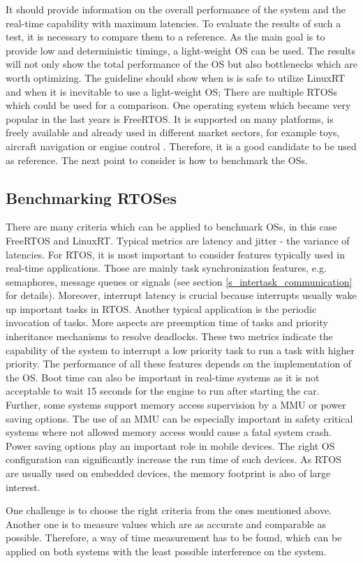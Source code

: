 It should provide information on the overall performance of the system and the real-time capability with maximum latencies.  
To evaluate the results of such a test, it is necessary to compare them to a reference. 
As the main goal is to provide low and deterministic timings, a light-weight \ac{OS} can be used.
The results will not only show the total performance of the \ac{OS} but also bottlenecks which are worth optimizing. 
The guideline should show when is is safe to utilize LinuxRT and when it is inevitable to use a light-weight \ac{OS};
There are multiple \acp{RTOS} which could be used for a comparison. 
One operating system which became very popular in the last years is FreeRTOS.
It is supported on many platforms, is freely available and already used in different market sectors, for example toys, aircraft navigation or engine control \cite{freertos}. 
Therefore, it is a good candidate to be used as reference.  
The next point to consider is how to benchmark the \acp{OS}.
 
\subsection{Benchmarking RTOSes}
There are many criteria which can be applied to benchmark \acp{OS}, in this case FreeRTOS and LinuxRT.
Typical metrics are latency and jitter - the variance of latencies.
For \ac{RTOS}, it is most important to consider features typically used in real-time applications.
Those are mainly task synchronization features, e.g. semaphores, message queues or signals (see section \ref{s_intertask_communication} for details).
Moreover, interrupt latency is crucial because interrupts usually wake up important tasks in \ac{RTOS}.
Another typical application is the periodic invocation of tasks. 
More aspects are preemption time of tasks and priority inheritance mechanisms to resolve deadlocks.
These two metrics indicate the capability of the system to interrupt a low priority task to run a task with higher priority. 
The performance of all these features depends on the implementation of the \ac{OS}.
Boot time can also be important in real-time systems as it is not acceptable to wait 15 seconds for the engine to run after starting the car.
Further, some systems support memory access supervision by a \ac{MMU} or power saving options.
The use of an \ac{MMU} can be especially important in safety critical systems where not allowed memory access would cause a fatal system crash.
Power saving options play an important role in mobile devices.
The right \ac{OS} configuration can significantly increase the run time of such devices.
As \ac{RTOS} are usually used on embedded devices, the memory footprint is also of large interest. 
\par
One challenge is to choose the right criteria from the ones mentioned above. 
Another one is to measure values which are as accurate and comparable as possible.
Therefore, a way of time measurement has to be found, which can be applied on both systems with the least possible interference on the system.

